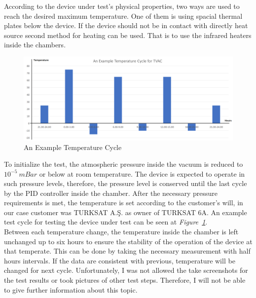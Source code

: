 	According to the device under test's physical properties, two ways are used to reach the desired maximum temperature. One of them is using spacial thermal plates below the device. If the device should not be in contact with directly heat source second method for heating can be used.  That is to use the infrared heaters inside the chambers.
	
\begin{figure}[H]
	\center
	\setlength{\unitlength}{\textwidth} 
	\includegraphics[width=1.0\unitlength]{tvac-cycle}
	\caption{\label{fig:tvac-cycle}An Example Temperature Cycle }
\end{figure}


	 To initialize the test, the atmospheric pressure inside the vacuum is reduced to $10^{-5}~mBar$ or below at room temperature. The device is expected to operate in such pressure levels, therefore, the pressure level is conserved until the last cycle by the PID controller inside the chamber. After the necessary pressure requirements is met, the temperature is set according to the customer's will, in our case customer was TURKSAT A.Ş. as owner of TURKSAT 6A. An example test cycle for testing the device under test can be seen at \textit{Figure~\ref{fig:tvac-cycle}}. \\
	 
	 Between each temperature change, the temperature inside the chamber is left unchanged up to six hours to ensure the stability of the operation of the device at that temperate. This can be done by taking the necessary measurement with half hours intervals. If the data are consistent with previous, temperature will be changed for next cycle. Unfortunately, I was not allowed the take screenshots for the test results or took pictures of other test steps. Therefore,  I will not be able to give further information about this topic.\\
	 
	 	 
	 
	
\newpage	

